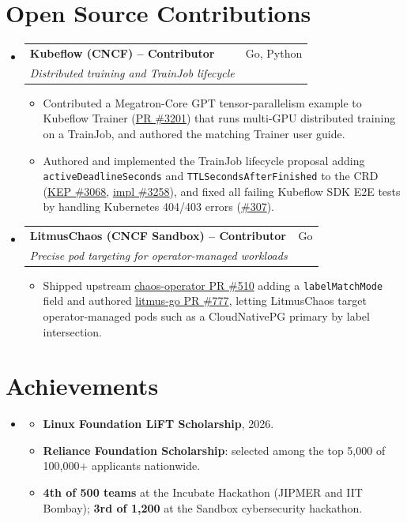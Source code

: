 \documentclass[letterpaper,10pt]{article} %
\makeatletter
\newcommand{\resumeItem}[1]{
  \item\small{
    {#1 \vspace{-1pt}}
  }
}
\newcommand{\resumeSubheading}[4]{
  \vspace{-1pt}\item
    \begin{tabular*}{0.97\textwidth}[t]{l@{\extracolsep{\fill}}r}
      \textbf{#1} & \small #2 \\
      \textit{\small#3} & \textit{\small #4} \\
    \end{tabular*}\vspace{-6pt}
}
\newcommand{\resumeSubHeadingListStart}{\begin{itemize}[leftmargin=0.15in, label={}]}
\newcommand{\resumeSubHeadingListEnd}{\end{itemize}}
\newcommand{\resumeItemListStart}{\begin{itemize}}
\newcommand{\resumeItemListEnd}{\end{itemize}\vspace{-2pt}}
\makeatother
\begin{document}
\section{Open Source Contributions}
  \resumeSubHeadingListStart

    \resumeSubheading
      {Kubeflow (CNCF) -- Contributor}{Go, Python}
      {Distributed training and TrainJob lifecycle}{}
      \resumeItemListStart
        \resumeItem{Contributed a Megatron-Core GPT tensor-parallelism example to Kubeflow Trainer (\href{https://github.com/kubeflow/trainer/pull/3201}{PR \#3201}) that runs multi-GPU distributed training on a TrainJob, and authored the matching Trainer user guide.}
        \resumeItem{Authored and implemented the TrainJob lifecycle proposal adding \texttt{activeDeadlineSeconds} and \texttt{TTLSecondsAfterFinished} to the CRD (\href{https://github.com/kubeflow/trainer/pull/3068}{KEP \#3068}, \href{https://github.com/kubeflow/trainer/pull/3258}{impl \#3258}), and fixed all failing Kubeflow SDK E2E tests by handling Kubernetes 404/403 errors (\href{https://github.com/kubeflow/sdk/pull/307}{\#307}).}
      \resumeItemListEnd

    \resumeSubheading
      {LitmusChaos (CNCF Sandbox) -- Contributor}{Go}
      {Precise pod targeting for operator-managed workloads}{}
      \resumeItemListStart
        \resumeItem{Shipped upstream \href{https://github.com/litmuschaos/chaos-operator/pull/510}{chaos-operator PR \#510} adding a \texttt{labelMatchMode} field and authored \href{https://github.com/litmuschaos/litmus-go/pull/777}{litmus-go PR \#777}, letting LitmusChaos target operator-managed pods such as a CloudNativePG primary by label intersection.}
      \resumeItemListEnd

  \resumeSubHeadingListEnd

\section{Achievements}
  \resumeSubHeadingListStart
    \item
      \resumeItemListStart
        \resumeItem{\textbf{Linux Foundation LiFT Scholarship}, 2026.}
        \resumeItem{\textbf{Reliance Foundation Scholarship}: selected among the top 5,000 of 100,000+ applicants nationwide.}
        \resumeItem{\textbf{4th of 500 teams} at the Incubate Hackathon (JIPMER and IIT Bombay); \textbf{3rd of 1,200} at the Sandbox cybersecurity hackathon.}
      \resumeItemListEnd
  \resumeSubHeadingListEnd

\end{document}
